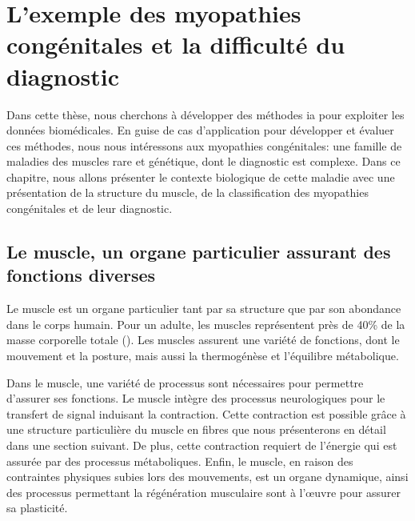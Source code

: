 \chapter{L’exemple des myopathies congénitales et la difficulté du diagnostic}
Dans cette thèse, nous cherchons à développer des méthodes \gls{ia} pour exploiter les données biomédicales. En guise de cas d'application pour développer et évaluer ces méthodes, nous  nous intéressons aux myopathies congénitales: une famille de maladies des muscles rare et génétique, dont le diagnostic est complexe. Dans ce chapitre, nous allons présenter le contexte biologique de cette maladie avec une présentation de la structure du muscle, de la classification des myopathies congénitales et de leur diagnostic.

\section{Le muscle, un organe particulier assurant des fonctions diverses}
Le muscle est un organe particulier tant par sa structure que par son abondance dans le corps humain. Pour un adulte, les muscles représentent près de 40\% de la masse corporelle totale (\cite{janssen_skeletal_2000}). Les muscles assurent une variété de fonctions, dont le mouvement et la posture, mais aussi la thermogénèse et l'équilibre métabolique.

Dans le muscle, une variété de processus sont nécessaires pour permettre d'assurer ses fonctions. Le muscle intègre des processus neurologiques pour le transfert de signal induisant la contraction. Cette contraction est possible grâce à une structure particulière du muscle en fibres que nous présenterons en détail dans une section suivant. De plus, cette contraction requiert de l'énergie qui est assurée par des processus métaboliques. Enfin, le muscle, en raison des contraintes physiques subies lors des mouvements, est un organe dynamique, ainsi des processus permettant la régénération musculaire sont à l'œuvre pour assurer sa plasticité.

